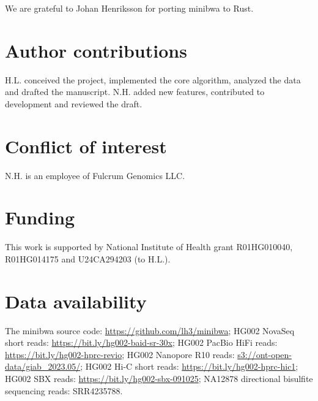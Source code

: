 \documentclass[webpdf,contemporary,large,namedate]{oup-authoring-template}%
\begin{document}
We are grateful to Johan Henriksson for porting minibwa to Rust.

\section*{Author contributions}

H.L. conceived the project, implemented the core algorithm, analyzed the data and drafted the manuscript.
N.H. added new features, contributed to development and reviewed the draft.

\section*{Conflict of interest}

N.H. is an employee of Fulcrum Genomics LLC.

\section*{Funding}

This work is supported by National Institute of Health grant R01HG010040, R01HG014175 and U24CA294203 (to H.L.).

\section*{Data availability}

The minibwa source code: \url{https://github.com/lh3/minibwa};
HG002 NovaSeq short reads: \url{https://bit.ly/hg002-baid-sr-30x};
HG002 PacBio HiFi reads: \url{https://bit.ly/hg002-hprc-revio};
HG002 Nanopore R10 reads: \url{s3://ont-open-data/giab\_2023.05/};
HG002 Hi-C short reads: \url{https://bit.ly/hg002-hprc-hic1};
HG002 SBX reads: \url{https://bit.ly/hg002-sbx-091025};
NA12878 directional bisulfite sequencing reads: SRR4235788.


{\sffamily\small
}
\end{document}
